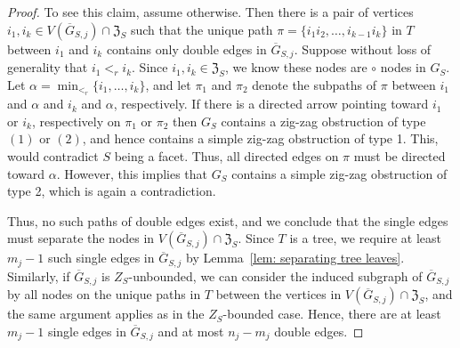 \begin{proof}
To see this claim, assume otherwise.  
Then there is a pair of vertices $i_1,i_k\in V(\overline{G}_{S,j})\cap\mathfrak{Z}_S$ such that the unique path $\pi = \{i_1i_2,\ldots, i_{k-1}i_k\}$ in $T$ between $i_1$ and $i_k$ contains only double edges in $\overline{G}_{S,j}$.  
Suppose without loss of generality that $i_1 <_r i_k$.  
Since $i_1,i_k\in\mathfrak{Z}_S$, we know these nodes are $\circ$ nodes in $G_S$.  
Let $\alpha = \min_{<_r}\{i_1,\ldots, i_k\}$, and let $\pi_1$ and $\pi_2$ denote the subpaths of $\pi$ between $i_1$ and $\alpha$ and $i_k$ and $\alpha$, respectively. 
If there is a directed arrow pointing toward $i_1$ or $i_k$, respectively on $\pi_1$ or $\pi_2$ then $G_S$ contains a zig-zag obstruction of type $(1)$ or $(2)$, and hence contains a simple zig-zag obstruction of type 1.  
This, would contradict $S$ being a facet. 
Thus, all directed edges on $\pi$ must be directed toward $\alpha$.
However, this implies that $G_S$ contains a simple zig-zag obstruction of type 2, which is again a contradiction. 

Thus, no such paths of double edges exist, and we conclude that the single edges must separate the nodes in $V(\overline{G}_{S,j})\cap\mathfrak{Z}_S$.  
Since $T$ is a tree, we require at least $m_j - 1$ such single edges in $\overline{G}_{S,j}$ by Lemma~\ref{lem: separating tree leaves}.  
Similarly, if $\overline{G}_{S,j}$ is $Z_S$-unbounded, we can consider the induced subgraph of $\overline{G}_{S,j}$ by all nodes on the unique paths in $T$ between the vertices in $V(\overline{G}_{S,j})\cap\mathfrak{Z}_S$, and the same argument applies as in the $Z_S$-bounded case. 
Hence, there are at least $m_j-1$ single edges in $\overline{G}_{S,j}$ and at most $n_j - m_j$ double edges.


\end{proof}
